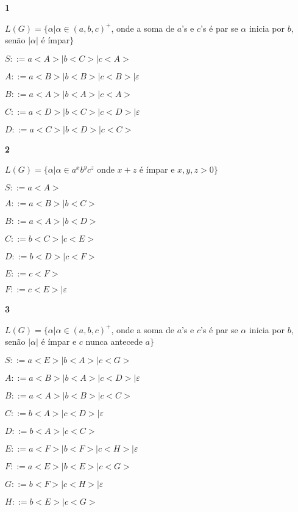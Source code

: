 \documentclass[ ]{article}
\begin{document}
\textbf{1}

	$L(G) = \{ \alpha | \alpha \in (a,b,c)^+$, onde a soma de $a$'s e $c$'s é par se $\alpha$ inicia por $b$, senão $|\alpha|$ é ímpar$\}$
	
	$S ::= a<A>| b<C> | c <A> $ %
	
	$A ::= a <B> | b<B> | c<B> | \varepsilon$ %
	
	$B ::= a <A> | b<A> | c<A>$
	
	$C ::= a<D> | b<C> | c<D> | \varepsilon$ %
	
	$D ::= a<C> | b<D> | c<C>$
	
	
\textbf{2}

	$L(G) = \{\alpha | \alpha \in a^x b^yc^z$ onde $x+z$ é ímpar e $x,y,z>0 \}$
	
	$S::= a <A>$
	
	$A::= a<B> |b<C>$ %
	
	$B::= a<A>| b<D>$ %
	
	$C::= b<C> | c<E> $ %
	
	$D::= b<D> | c<F> $ %
	
	$E::= c<F>$ %
	
	$F::= c<E> | \varepsilon$ %
	
\textbf{3}

	$L(G) = \{ \alpha | \alpha \in (a,b,c)^+$, onde a soma de $a$'s e $c$'s é par se $\alpha$ inicia por $b$, senão $|\alpha|$ é ímpar e $c$ nunca antecede $a\}$
	
	$S::= a<E> | b<A> | c<G>$
	
	$A::= a<B> | b<A> | c<D> | \varepsilon$ %
	
	$B::= a<A> |b<B> | c<C>$ %
	
	$C::= b<A>|c<D> | \varepsilon$%
	
	$D::= b<A>|c<C> $ %

	$E::= a<F> | b<F> | c<H> | \varepsilon$ %
	
	$F::= a<E> | b<E> | c<G>$ %
	
	$G::= b<F> | c<H>| \varepsilon$ %
	
	$H::= b<E> | c<G>$ %
	
	\newpage
\end{document}
